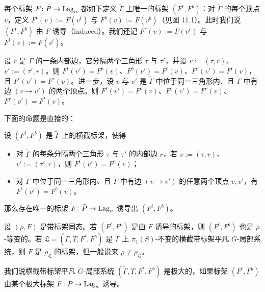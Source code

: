 

每个标架 $F\colon\tilde P\to\operatorname{Lag}_n$ 都如下定义 $\tilde\Gamma$ 上唯一的标架 $(F^{t},F^{b})$：对 $\tilde\Gamma$ 的每个顶点 $v$，定义 $F^{t}(v):=F(v^{t})$ 与 $F^{b}(v):=F(v^{b})$（见图 11.1）。此时我们说 $(F^{t},F^{b})$ 由 $F$ 诱导（induced）。我们还记 $F^{r}(v):=F(v^{r})$ 与 $F^{l}(v):=F(v^{l})$。

设 $r$ 是 $\tilde\Gamma$ 的一条内部边，它分隔两个三角形 $\tau$ 与 $\tau'$，并设 $v:=(\tau,r)$、$v':=(\tau',r)$。则 $F^{t}(v')=F^{b}(v)$、$F^{b}(v')=F^{t}(v)$、$F^{r}(v')=F^{l}(v)$，且 $F^{l}(v')=F^{r}(v)$。进一步，设 $v$ 与 $v'$ 是 $\tilde\Gamma$ 中位于同一三角形内、且 $\tilde\Gamma$ 中有边 $(v\to v')$ 的两个顶点。则 $F^{t}(v')=F^{b}(v)$、$F^{b}(v')=F^{r}(v)$、$F^{r}(v')=F^{t}(v)$。

下面的命题是直接的：

\begin{proposition}[11.37]
设 $(F^{t},F^{b})$ 是 $\tilde\Gamma$ 上的横截标架，使得
\begin{itemize}
\item 对 $\tilde\Gamma$ 的每条分隔两个三角形 $\tau$ 与 $\tau'$ 的内部边 $r$，若 $v:=(\tau,r)$、$v':=(\tau',r)$，则 $F^{t}(v')=F^{b}(v)$；
\item 对 $\tilde\Gamma$ 中位于同一三角形内、且 $\tilde\Gamma$ 中有边 $(v\to v')$ 的任意两个顶点 $v,v'$，有 $F^{t}(v')=F^{b}(v)$。
\end{itemize}
那么存在唯一的标架 $F\colon\tilde P\to\operatorname{Lag}_n$ 诱导出 $(F^{t},F^{b})$。
\end{proposition}

\begin{remark}[11.38]
设 $(\rho,F)$ 是带标架同态。若 $(F^{t},F^{b})$ 是由 $F$ 诱导的标架，则 $(F^{t},F^{b})$ 也是 $\rho$-等变的。若 $\mathfrak{L}=(\tilde\Gamma,T,F^{t},F^{b})$ 是 $\tilde\Gamma$ 上 $\pi_1(S)$-不变的横截带标架平凡 $G$-局部系统，则 $F$ 是 $\rho_{\mathfrak{L}}$ 的标架，但一般说来 $\rho\ne\rho_{\mathfrak{L}}$。
\end{remark}

\begin{definition}[11.39]
我们说横截带标架平凡 $G$-局部系统 $(\tilde\Gamma,T,F^{t},F^{b})$ 是极大的，如果标架 $(F^{t},F^{b})$ 由某个极大标架 $F\colon\tilde P\to\operatorname{Lag}_n$ 诱导。
\end{definition}

